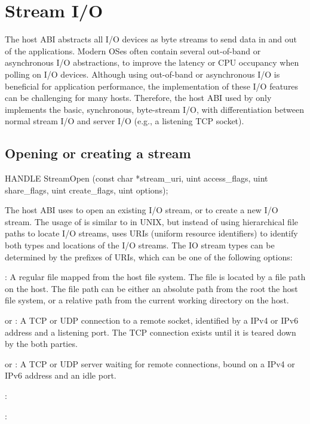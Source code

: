 \section{Stream I/O}
\label{sec:abi:streams}


The host ABI abstracts all I/O devices as byte streams to send data in and out of the applications.
Modern OSes often contain several out-of-band or asynchronous I/O abstractions, to improve the latency or CPU occupancy when polling on I/O devices.
Although using out-of-band or asynchronous I/O is beneficial for application performance, the implementation of these I/O features can be challenging for many hosts.
Therefore, the host ABI used by \graphene{} only implements the basic, synchronous, byte-stream I/O,
with differentiation between normal stream I/O and server I/O (e.g., a listening TCP socket).  

\subsection*{Opening or creating a stream}


\begin{paldef}
HANDLE StreamOpen (const char *stream_uri,
                   uint access_flags, uint share_flags,
                   uint create_flags, uint options);
\end{paldef}


The host ABI uses  to open an existing I/O stream, or to create a new I/O stream.
The usage of  is similar to  in UNIX, but instead of using hierarchical file paths to locate I/O streams,  uses URIs (uniform resource identifiers) to identify both types and locations of the I/O streams.
The IO stream types can be determined by the {\rm prefixes} of URIs, which can be one of the following options:

\begin{compactitem}
\item {}: A regular file mapped from the host file system. The file is located by a file path on the host. The file path can be either an absolute path from the root the host file system, or a relative path from the current working directory on the host.
\item {} or : A TCP or UDP connection to a remote socket, identified by a IPv4 or IPv6 address and a listening port. The TCP connection exists until it is teared down by the both parties.
\item {} or : A TCP or UDP server waiting for remote connections, bound on a IPv4 or IPv6 address and an idle port.
\item {}:
\item {}:
\end{compactitem}

